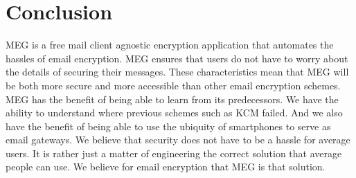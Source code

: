 \documentclass[10pt,twocolumn]{article}
\begin{document}
\section{Conclusion}
\par MEG is a free mail client agnostic encryption application that automates the hassles of email encryption. MEG ensures that users do not have to worry about the details of securing their messages. These characteristics mean that MEG will be both more secure and more accessible than other email encryption schemes. MEG has the benefit of being able to learn from its predecessors. We have the ability to understand where previous schemes such as KCM failed. And we also have the benefit of being able to use the ubiquity of smartphones to serve as email gateways. We believe that security does not have to be a hassle for average users. It is rather just a matter of engineering the correct solution that average people can use. We believe for email encryption that MEG is that solution.


\end{document}
